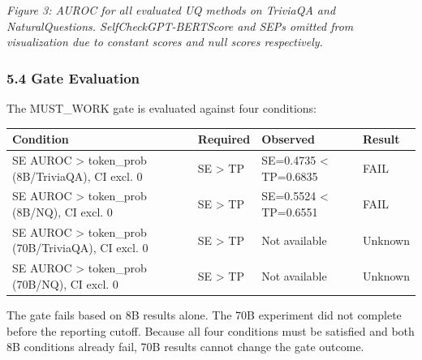 \textit{Figure 3: AUROC for all evaluated UQ methods on TriviaQA and NaturalQuestions. SelfCheckGPT-BERTScore and SEPs omitted from visualization due to constant scores and null scores respectively.}

\subsubsection{5.4 Gate Evaluation}

The MUST_WORK gate is evaluated against four conditions:

\begin{table}[htbp]
\centering
\begin{tabular}{llll}
\toprule
Condition & Required & Observed & Result \\
\midrule
SE AUROC > token_prob (8B/TriviaQA), CI excl. 0 & SE > TP & SE=0.4735 < TP=0.6835 & FAIL \\
SE AUROC > token_prob (8B/NQ), CI excl. 0 & SE > TP & SE=0.5524 < TP=0.6551 & FAIL \\
SE AUROC > token_prob (70B/TriviaQA), CI excl. 0 & SE > TP & Not available & Unknown \\
SE AUROC > token_prob (70B/NQ), CI excl. 0 & SE > TP & Not available & Unknown \\
\bottomrule
\end{tabular}
\end{table}

The gate fails based on 8B results alone. The 70B experiment did not complete before the reporting cutoff. Because all four conditions must be satisfied and both 8B conditions already fail, 70B results cannot change the gate outcome.

